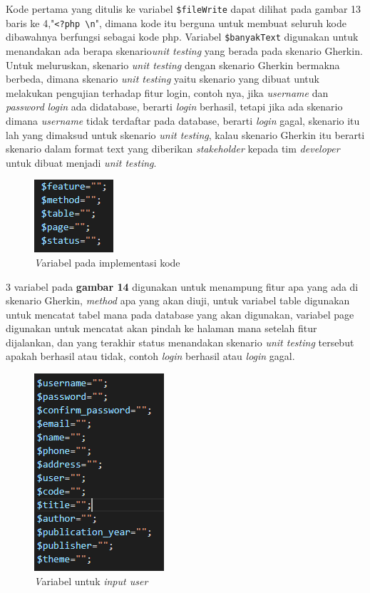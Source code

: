 \documentclass[a4paper,twoside]{article}
\begin{document}
\begin{enumerate}
Kode pertama yang ditulis ke variabel \texttt{\$fileWrite} dapat dilihat pada gambar 13 baris ke 4,"\texttt{<?php \textbackslash n}", dimana kode itu berguna untuk membuat seluruh kode dibawahnya berfungsi sebagai kode php. Variabel \texttt{\$banyakText} digunakan untuk menandakan ada berapa skenario\textit{unit testing} yang berada pada skenario Gherkin. Untuk meluruskan, skenario \textit{unit testing} dengan skenario Gherkin bermakna berbeda, dimana skenario \textit{unit testing} yaitu skenario yang dibuat untuk melakukan pengujian terhadap fitur login, contoh nya, jika \textit{username} dan \textit{password} \textit{login} ada didatabase, berarti \textit{login} berhasil, tetapi jika ada skenario dimana \textit{username} tidak terdaftar pada database, berarti \textit{login} gagal, skenario itu lah yang dimaksud untuk skenario \textit{unit testing}, kalau skenario Gherkin itu berarti skenario dalam format text yang diberikan \textit{stakeholder} kepada tim \textit{developer} untuk dibuat menjadi \textit{unit testing}.

\begin{figure}[h!]
			\includegraphics[scale=1.00]{../DokumenSkripsi/gambar/implementasi3}
			\centering
			\caption{\textit Variabel pada implementasi kode}
		\end{figure}

3 variabel pada \textbf{gambar 14} digunakan untuk menampung fitur apa yang ada di skenario Gherkin, \textit{method} apa yang akan diuji, untuk variabel table digunakan untuk mencatat tabel mana pada database yang akan digunakan, variabel page digunakan untuk mencatat akan pindah ke halaman mana setelah fitur dijalankan, dan yang terakhir status menandakan skenario \textit{unit testing} tersebut apakah berhasil atau tidak, contoh \textit{login} berhasil atau \textit{login} gagal.

\begin{figure}[h!]
			\includegraphics[scale=1.00]{../DokumenSkripsi/gambar/implementasi4}
			\centering
			\caption{\textit Variabel untuk \textit{input user}}
		\end{figure}


\end{enumerate}
\end{document}
